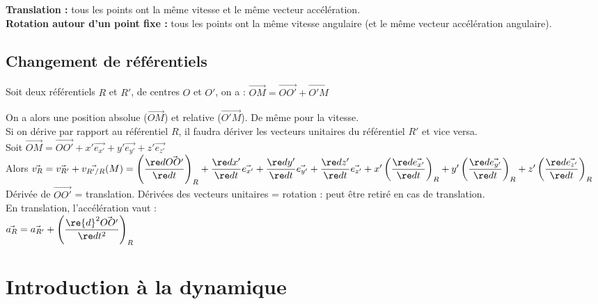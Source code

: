 \documentclass[13pt, twoside, a4paper, french]{report}
\begin{document}
        \textbf{Translation :} tous les points ont la même vitesse et le même vecteur accélération.\\
        
        \textbf{Rotation autour d'un point fixe :} tous les points ont la même vitesse angulaire (et le même vecteur accélération angulaire).
    
    
    \section{Changement de référentiels}\label{sec:changement-de-referentiels}
        
        Soit deux référentiels $R$ et $R'$, de centres $O$ et $O'$, on a : $\vec{OM} = \vec{OO'} + \vec{O'M}$
        
        On a alors une position absolue ($\vec{OM}$) et relative ($\vec{O'M}$).
        De même pour la vitesse.\\
        
        Si on dérive par rapport au référentiel $R$, il faudra dériver les vecteurs unitaires du référentiel $R'$ et vice versa.\\
        
        Soit $\vec{OM} = \vec{OO'} + x' \vec{e_{x'}} + y' \vec{e_{y'}} + z' \vec{e_{z'}}$\\
        Alors $\vec{v_{R}} = \vec{v_{R'}} + \vec{v_{R'/R}}(M) = \left( \dfrac{\re d \vec{OO'}}{\re d t} \right)_R + \dfrac{\re d x'}{\re d t} \vec{e_{x'}} + \dfrac{\re d y'}{\re d t} \vec{e_{y'}} + \dfrac{\re d z'}{\re d t} \vec{e_{z'}} + x' \left( \dfrac{\re d \vec{e_{x'}}}{\re d t} \right)_R + y' \left( \dfrac{\re d \vec{e_{y'}}}{\re d t} \right)_R + z' \left( \dfrac{\re d \vec{e_{z'}}}{\re d t} \right)_R$\\
        
        Dérivée de $\vec{OO'}$ = translation.
        Dérivées des vecteurs unitaires = rotation : peut être retiré en cas de translation.\\
        En translation, l'accélération vaut :\\
        
        $\vec{a_R} = \vec{a_{R'}} + \left( \dfrac{\re{d}^2 \vec{OO'}}{\re d t^2} \right)_R$


\chapter{Introduction à la dynamique}\label{ch:introduction-a-la-dynamique}
    
\end{document}
